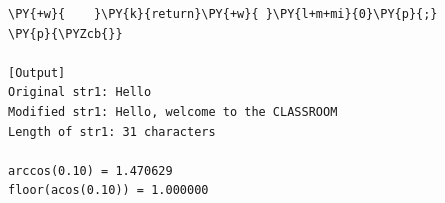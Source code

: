\begin{Verbatim}[label=\makebox{\url{https://github.com/lucabaldini/cmepda/tree/master/slides/latex/snippets/strings_and_math.c}},commandchars=\\\{\}]
\PY{+w}{    }\PY{k}{return}\PY{+w}{ }\PY{l+m+mi}{0}\PY{p}{;}
\PY{p}{\PYZcb{}}

[Output]
Original str1: Hello
Modified str1: Hello, welcome to the CLASSROOM
Length of str1: 31 characters

arccos(0.10) = 1.470629
floor(acos(0.10)) = 1.000000
\end{Verbatim}